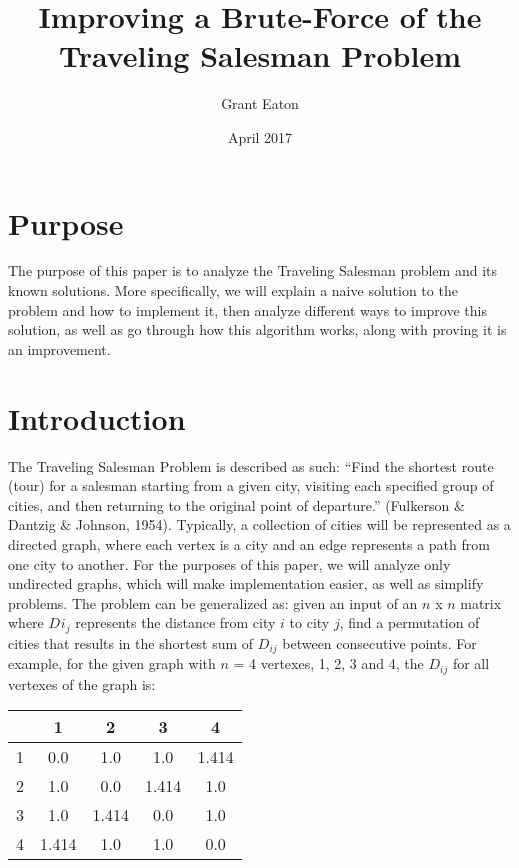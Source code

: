 \documentclass[a4paper,titlepage, margin, 11pt]{article}
\title{Improving a Brute-Force of the Traveling Salesman Problem}
\author{Grant Eaton }
\date{April 2017}
\numberwithin{equation}{section}
\begin{document}
\maketitle

\section{Purpose}
The purpose of this paper is to analyze the Traveling Salesman problem and its known solutions. More specifically, we will explain a naive solution to the problem and how to implement it, then analyze different ways to improve this solution, as well as go through how this algorithm works, along with proving it is an improvement.


\section{Introduction}
The Traveling Salesman Problem is described as such: ``Find the shortest route (tour) for a salesman starting from a given city, visiting each specified group of cities, and then returning to the original point of departure.'' (Fulkerson \& Dantzig \& Johnson, 1954). Typically, a collection of cities will be represented as a directed graph, where each vertex is a city and an edge represents a path from one city to another. For the purposes of this paper, we will analyze only undirected graphs, which will make implementation easier, as well as simplify problems. The problem can be generalized as: given an input of an $n$ x $n$ matrix where $D_{}i_j$ represents the distance from city $i$ to city $j$, find a permutation of cities that results in the shortest sum of $D_{ij}$ between consecutive points. 
For example, for the given graph with $n$ = 4 vertexes, 1, 2, 3 and 4, the  $D_{ij}$ for all vertexes of the graph is:


\begin{table}[h]
\centering
\begin{tabular}{c | c | c | c | c|}
    & 1 & 2 & 3 & 4 \\\hline
    1 & 0.0 & 1.0 & 1.0 & 1.414 \\ \hline
    2 & 1.0 & 0.0 & 1.414 & 1.0 \\\hline
    3 & 1.0 & 1.414 & 0.0 & 1.0 \\\hline
    4 & 1.414 & 1.0 & 1.0 & 0.0 \\
    \hline
  \end{tabular}
\end{table}
\end{document}
